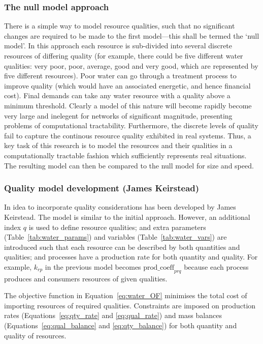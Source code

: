 \subsubsection*{The null model approach}
There is a simple way to model resource qualities, such that no significant changes are required to be made to the first model---this shall be termed the `null model'. In this approach each resource is sub-divided into several discrete resources of differing quality (for example, there could be five different water qualities: very poor, poor, average, good and very good, which are represented by five different resources). Poor water can go through a treatment process to improve quality (which would have an associated energetic, and hence financial cost). Final demands can take any water resource with a quality above a minimum threshold. Clearly a model of this nature will become rapidly become very large and inelegent for networks of significant magnitude, presenting problems of computational tractability. Furthermore, the discrete levels of quality fail to capture the continous resource quality exhibited in real systems.  Thus, a key task of this research is to model the resources and their qualities in a computationally tractable fashion which sufficiently represents real situations. The resulting model can then be compared to the null model for size and speed.

\subsubsection*{Quality model development (James Keirstead)}
In idea to incorporate quality considerations has been developed by James Keirstead. The model is similar to the initial approach. However, an additional index $q$ is used to define resource qualities; and extra parameters (Table~\ref{tab:water_params}) and variables (Table~\ref{tab:water_vars}) are introduced such that each resource can be described by both quantities and qualities; and processes have a production rate for both quantity and quality. For example, $k_{rp}$ in the previous model becomes $\mbox{prod\_coeff}_{prq}$ because each process produces and consumers resources of given qualities.
 
 

The objective function in Equation~\eqref{eq:water_OF} minimises the total cost of importing resources of required qualities. Constraints are imposed on production rates (Equations~\eqref{eq:qty_rate} and \eqref{eq:qual_rate}) and mass balances (Equations~\eqref{eq:qual_balance} and \eqref{eq:qty_balance}) for both quantity and quality of resources.

